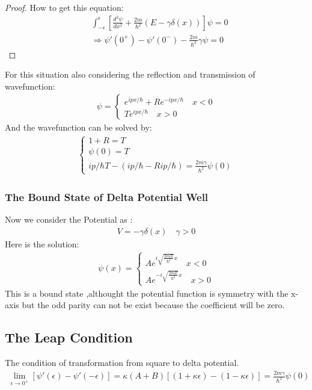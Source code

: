 \documentclass{article}
\begin{document}
\begin{proof}
 How to get this equation:
 \begin{align*}
&\int^{\epsilon}_{-\epsilon}[\frac{d^2\psi}{dx^2}+\frac{2m}{\hbar^2}(E-\gamma\delta(x))]\psi=0\\
&\Rightarrow \psi'(0^+)-\psi'(0^-)-\frac{2m}{\hbar^2}\gamma\psi=0
 \end{align*}
\end{proof}
For this situation also considering the reflection and transmission of wavefunction:
\begin{align}
  \psi=\begin{cases}
    e^{ipx/\hbar}+Re^{-ipx/\hbar}\quad x<0\\
    Te^{ipx/\hbar}\quad x>0
  \end{cases}
\end{align}
And the wavefunction can be solved by:
\begin{align}
  \begin{cases}
1+R=T\\
\psi(0)=T\\
ip/\hbar T-(ip/\hbar-Rip/\hbar)=\frac{2m\gamma}{\hbar^2}\psi(0)
  \end{cases}
\end{align}

\subsubsection{The Bound State of Delta Potential Well}

Now we consider the Potential as :
\begin{align}
V=-\gamma\delta(x)\quad\gamma>0
\end{align}
Here is the solution:
\begin{align}
  \psi(x)=\begin{cases}
    Ae^{i\sqrt{\frac{2mE}{\hbar^2}}x}\quad x<0\\
    Ae^{-i\sqrt{\frac{2mE}{\hbar^2}}x}\quad x>0
  \end{cases}
\end{align}
This is a bound state ,althought the potential function is symmetry with the x-axis but the odd parity can not be exist because the coefficient will be zero.

\subsection{The Leap Condition}
The condition of transformation from square to delta potential.
\begin{align}
  \lim_{\epsilon \rightarrow 0^+}[\psi'(\epsilon)-\psi'(-\epsilon)]=\kappa(A+B)[(1+\kappa\epsilon)-(1-\kappa\epsilon)]=\frac{2m\gamma}{\hbar^2}\psi(0)
\end{align}
\end{document}
